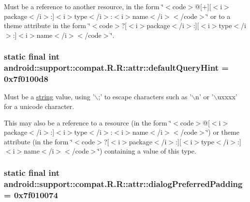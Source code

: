 Must be a reference to another resource, in the form \char`\"{}$<$code$>$@\mbox{[}+\mbox{]}\mbox{[}$<$i$>$package$<$/i$>$:\mbox{]}$<$i$>$type$<$/i$>$:$<$i$>$name$<$/i$>$$<$/code$>$\char`\"{} or to a theme attribute in the form \char`\"{}$<$code$>$?\mbox{[}$<$i$>$package$<$/i$>$:\mbox{]}\mbox{[}$<$i$>$type$<$/i$>$:\mbox{]}$<$i$>$name$<$/i$>$$<$/code$>$\char`\"{}. \hypertarget{classandroid_1_1support_1_1compat_1_1_r_1_1attr_ac86087511bbaba30f27bcfe98097a68}{
\subsubsection[{defaultQueryHint}]{\setlength{\rightskip}{0pt plus 5cm}static final int android::support::compat.R.R::attr::defaultQueryHint = 0x7f0100d8}}
\label{classandroid_1_1support_1_1compat_1_1_r_1_1attr_ac86087511bbaba30f27bcfe98097a68}


Must be a \hyperlink{classandroid_1_1support_1_1compat_1_1_r_1_1string}{string} value, using '$\backslash$;' to escape characters such as '$\backslash$n' or '$\backslash$uxxxx' for a unicode character. 

This may also be a reference to a resource (in the form \char`\"{}$<$code$>$@\mbox{[}$<$i$>$package$<$/i$>$:\mbox{]}$<$i$>$type$<$/i$>$:$<$i$>$name$<$/i$>$$<$/code$>$\char`\"{}) or theme attribute (in the form \char`\"{}$<$code$>$?\mbox{[}$<$i$>$package$<$/i$>$:\mbox{]}\mbox{[}$<$i$>$type$<$/i$>$:\mbox{]}$<$i$>$name$<$/i$>$$<$/code$>$\char`\"{}) containing a value of this type. \hypertarget{classandroid_1_1support_1_1compat_1_1_r_1_1attr_7c95d0065abf2be47f0d665c12bf9ec0}{
\subsubsection[{dialogPreferredPadding}]{\setlength{\rightskip}{0pt plus 5cm}static final int android::support::compat.R.R::attr::dialogPreferredPadding = 0x7f010074}}
\label{classandroid_1_1support_1_1compat_1_1_r_1_1attr_7c95d0065abf2be47f0d665c12bf9ec0}


